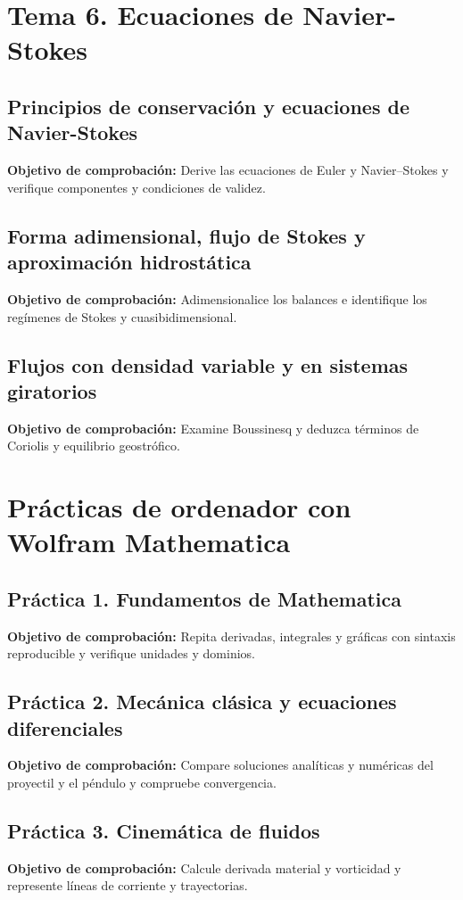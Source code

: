 \documentclass[10pt,openany]{book}
\begin{document}
\section*{Tema 6. Ecuaciones de Navier-Stokes}

\subsection*{Principios de conservación y ecuaciones de Navier-Stokes}
\noindent \textbf{Objetivo de comprobación:} Derive las ecuaciones de Euler y Navier--Stokes y verifique componentes y condiciones de validez.

\subsection*{Forma adimensional, flujo de Stokes y aproximación hidrostática}
\noindent \textbf{Objetivo de comprobación:} Adimensionalice los balances e identifique los regímenes de Stokes y cuasibidimensional.

\subsection*{Flujos con densidad variable y en sistemas giratorios}
\noindent \textbf{Objetivo de comprobación:} Examine Boussinesq y deduzca términos de Coriolis y equilibrio geostrófico.

\section*{Prácticas de ordenador con Wolfram Mathematica}

\subsection*{Práctica 1. Fundamentos de Mathematica}
\noindent \textbf{Objetivo de comprobación:} Repita derivadas, integrales y gráficas con sintaxis reproducible y verifique unidades y dominios.

\subsection*{Práctica 2. Mecánica clásica y ecuaciones diferenciales}
\noindent \textbf{Objetivo de comprobación:} Compare soluciones analíticas y numéricas del proyectil y el péndulo y compruebe convergencia.

\subsection*{Práctica 3. Cinemática de fluidos}
\noindent \textbf{Objetivo de comprobación:} Calcule derivada material y vorticidad y represente líneas de corriente y trayectorias.
\end{document}

